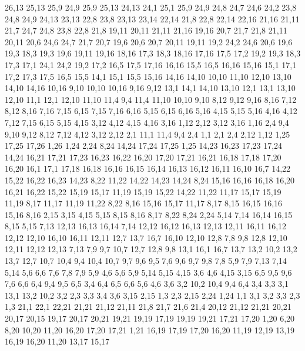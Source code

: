 26,13
25,13
25,9
%
24,9
25,9
25,13
24,13
%
24,1
25,1
25,9
24,9
24,8
24,7
24,6
24,2
%
23,8
24,8
24,9
24,13
23,13
%
22,8
23,8
23,13
23,14
22,14
%
21,8
22,8
22,14
22,16
21,16
21,11
%
21,7
24,7
24,8
23,8
22,8
21,8
%
19,11
20,11
21,11
21,16
19,16
%
20,7
21,7
21,8
21,11
20,11
%
20,6
24,6
24,7
21,7
20,7
%
19,6
20,6
20,7
20,11
19,11
%
19,2
24,2
24,6
20,6
19,6
19,3
%
18,3
19,3
19,6
19,11
19,16
18,16
%
17,3
18,3
18,16
17,16
17,5
%
17,2
19,2
19,3
18,3
17,3
%
17,1
24,1
24,2
19,2
17,2
%
16,5
17,5
17,16
16,16
%
15,5
16,5
16,16
15,16
%
15,1
17,1
17,2
17,3
17,5
16,5
15,5
%
14,1
15,1
15,5
15,16
14,16
14,10
%
10,10
11,10
12,10
13,10
14,10
14,16
10,16
%
9,10
10,10
10,16
9,16
9,12
%
13,1
14,1
14,10
13,10
%
12,1
13,1
13,10
12,10
%
11,1
12,1
12,10
11,10
11,4
%
9,4
11,4
11,10
10,10
9,10
%
8,12
9,12
9,16
8,16
%
7,12
8,12
8,16
7,16
7,15
%
6,15
7,15
7,16
6,16
%
5,15
6,15
6,16
5,16
%
4,15
5,15
5,16
4,16
%
4,12
7,12
7,15
6,15
5,15
4,15
%
3,12
4,12
4,15
4,16
3,16
%
1,12
2,12
3,12
3,16
1,16
%
2,4
9,4
9,10
9,12
8,12
7,12
4,12
3,12
2,12
%
2,1
11,1
11,4
9,4
2,4
%
1,1
2,1
2,4
2,12
1,12
1,25
17,25
17,26
1,26
%
1,24
2,24
8,24
14,24
17,24
17,25
1,25
%
14,23
16,23
17,23
17,24
14,24
%
16,21
17,21
17,23
16,23
16,22
%
16,20
17,20
17,21
16,21
%
16,18
17,18
17,20
16,20
%
16,1
17,1
17,18
16,18
16,16
16,15
16,14
16,13
16,12
16,11
16,10
16,7
%
14,22
15,22
16,22
16,23
14,23
%
8,22
11,22
14,22
14,23
14,24
8,24
%
15,16
16,16
16,18
16,20
16,21
16,22
15,22
15,19
15,17
%
11,19
15,19
15,22
14,22
11,22
%
11,17
15,17
15,19
11,19
%
8,17
11,17
11,19
11,22
8,22
%
8,16
15,16
15,17
11,17
8,17
%
8,15
16,15
16,16
15,16
8,16
%
2,15
3,15
4,15
5,15
8,15
8,16
8,17
8,22
8,24
2,24
%
5,14
7,14
16,14
16,15
8,15
5,15
%
7,13
12,13
16,13
16,14
7,14
%
12,12
16,12
16,13
12,13
%
12,11
16,11
16,12
12,12
%
12,10
16,10
16,11
12,11
%
12,7
13,7
16,7
16,10
12,10
12,8
%
7,8
9,8
12,8
12,10
12,11
12,12
12,13
7,13
7,9
%
9,7
10,7
12,7
12,8
9,8
%
13,1
16,1
16,7
13,7
13,2
%
10,2
13,2
13,7
12,7
10,7
10,4
%
9,4
10,4
10,7
9,7
9,6
9,5
%
7,6
9,6
9,7
9,8
7,8
%
5,9
7,9
7,13
7,14
5,14
%
5,6
6,6
7,6
7,8
7,9
5,9
%
4,6
5,6
5,9
5,14
5,15
4,15
%
3,6
4,6
4,15
3,15
%
6,5
9,5
9,6
7,6
6,6
%
6,4
9,4
9,5
6,5
%
3,4
6,4
6,5
6,6
5,6
4,6
3,6
%
3,2
10,2
10,4
9,4
6,4
3,4
3,3
%
3,1
13,1
13,2
10,2
3,2
%
2,3
3,3
3,4
3,6
3,15
2,15
%
1,3
2,3
2,15
2,24
1,24
%
1,1
3,1
3,2
3,3
2,3
1,3
21,1
22,1
22,21
21,21
21,12
21,11
21,8
21,7
21,6
21,4
%
20,12
21,12
21,21
20,21
20,17
20,15
%
19,17
20,17
20,21
19,21
19,19
%
17,19
19,19
19,21
17,21
17,20
%
1,20
6,20
8,20
10,20
11,20
16,20
17,20
17,21
1,21
%
16,19
17,19
17,20
16,20
%
11,19
12,19
13,19
16,19
16,20
11,20
%
13,17
15,17
